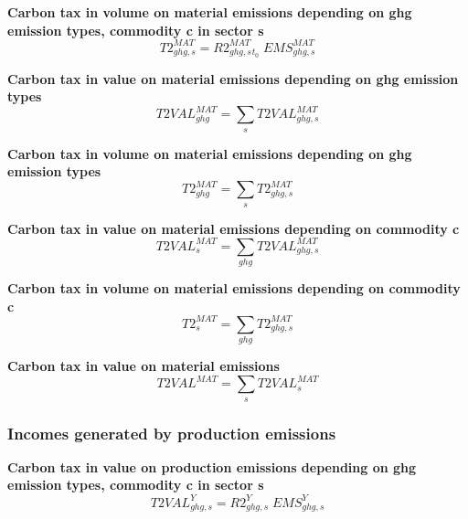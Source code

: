 \documentclass[12pt]{article}
\numberwithin{equation}{section}
\begin{document}
\noindent \textbf{Carbon tax in volume on material emissions depending on ghg emission types, commodity c in sector s} 
\begin{dmath}
T2^{MAT}_{ghg, s} = R2^{MAT}_{ghg, s}_{t_0} \; EMS^{MAT}_{ghg, s}
\label{Exception_taxes_prices.mdlT2_MAT[ghg,s]}
\end{dmath}

\noindent \textbf{Carbon tax in value on material emissions depending on ghg emission types} 
\begin{dmath}
T2VAL^{MAT}_{ghg} = \sum_{s} T2VAL^{MAT}_{ghg, s}
\label{Exception_taxes_prices.mdlT2VAL_MAT[ghg]}
\end{dmath}

\noindent \textbf{Carbon tax in volume on material emissions depending on ghg emission types} 
\begin{dmath}
T2^{MAT}_{ghg} = \sum_{s} T2^{MAT}_{ghg, s}
\label{Exception_taxes_prices.mdlT2_MAT[ghg]}
\end{dmath}

\noindent \textbf{Carbon tax in value on material emissions depending on commodity c} 
\begin{dmath}
T2VAL^{MAT}_{s} = \sum_{ghg} T2VAL^{MAT}_{ghg, s}
\label{Exception_taxes_prices.mdlT2VAL_MAT[s]}
\end{dmath}

\noindent \textbf{Carbon tax in volume on material emissions depending on commodity c} 
\begin{dmath}
T2^{MAT}_{s} = \sum_{ghg} T2^{MAT}_{ghg, s}
\label{Exception_taxes_prices.mdlT2_MAT[s]}
\end{dmath}

\noindent \textbf{Carbon tax in value on material emissions} 
\begin{dmath}
T2VAL^{MAT} = \sum_{s} T2VAL^{MAT}_{s}
\label{Exception_taxes_prices.mdlT2VAL_MAT}
\end{dmath}



\subsubsection{Incomes generated by production emissions}



\noindent \textbf{Carbon tax in value on production emissions depending on ghg emission types, commodity c in sector s} 
\begin{dmath}
T2VAL^{Y}_{ghg, s} = R2^{Y}_{ghg, s} \; EMS^{Y}_{ghg, s}
\label{Exception_taxes_prices.mdlT2VAL_Y[ghg,s]}
\end{dmath}
\end{document}
